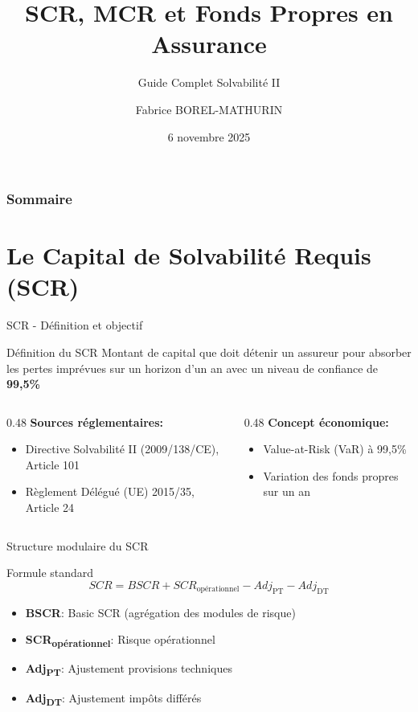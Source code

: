 \documentclass[10pt,aspectratio=169]{beamer}
\title{SCR, MCR et Fonds Propres en Assurance}
\subtitle{Guide Complet Solvabilité II}
\author[F. Borel-Mathurin]{Fabrice BOREL-MATHURIN}
\institute[ACPR-DEAR et SAF Lyon 1] {
ACPR - DEAR\\
et\\
Laboratoire SAF Université Claude Bernard Lyon 1}
\date{6 novembre 2025}
\begin{document}
\frame{\titlepage}

\begin{frame}
\frametitle{Sommaire}
\tableofcontents
\end{frame}

\section{Le Capital de Solvabilité Requis (SCR)}
\begin{frame}{SCR - Définition et objectif}
\begin{block}{Définition du SCR}
Montant de capital que doit détenir un assureur pour absorber les pertes imprévues sur un horizon d'un an avec un niveau de confiance de \textbf{99,5\%}
\end{block}

\begin{columns}[T]
\begin{column}{0.48\textwidth}
\textbf{Sources réglementaires:}
\begin{itemize}
\item Directive Solvabilité II (2009/138/CE), Article 101
\item Règlement Délégué (UE) 2015/35, Article 24
\end{itemize}
\end{column}
\begin{column}{0.48\textwidth}
\textbf{Concept économique:}
\begin{itemize}
\item Value-at-Risk (VaR) à 99,5\%
\item Variation des fonds propres sur un an
\end{itemize}
\end{column}
\end{columns}
\end{frame}

\begin{frame}{Structure modulaire du SCR}
\begin{block}{Formule standard}
\[
SCR = BSCR + SCR_{\text{opérationnel}} - Adj_{\text{PT}} - Adj_{\text{DT}}
\]
\end{block}

\begin{itemize}
\item \textbf{BSCR}: Basic SCR (agrégation des modules de risque)
\item \textbf{SCR\textsubscript{opérationnel}}: Risque opérationnel
\item \textbf{Adj\textsubscript{PT}}: Ajustement provisions techniques
\item \textbf{Adj\textsubscript{DT}}: Ajustement impôts différés
\end{itemize}
\end{frame}
\end{document}
